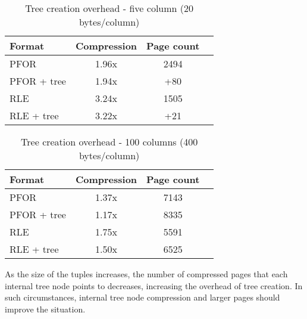 \documentclass{sig-alternate-sigmod08}
\begin{document}


\begin{table}
\caption{Tree creation overhead - five column (20 bytes/column)}
\centering
\label{table:treeCreation}
\begin{tabular}{|l|c|c|c|} \hline
Format     & Compression & Page count \\ \hline %
PFOR        & 1.96x       & 2494       \\ \hline %
PFOR + tree & 1.94x       & +80        \\ \hline %
RLE        & 3.24x       & 1505 \\ \hline %
RLE + tree & 3.22x       & +21        \\  %
\hline\end{tabular}
\end{table}
\begin{table}
\caption{Tree creation overhead - 100 columns (400 bytes/column)}
\centering
\label{table:treeCreationTwo}
\begin{tabular}{|l|c|c|c|} \hline
Format     & Compression & Page count \\ \hline %
PFOR        & 1.37x       & 7143       \\ \hline %
PFOR + tree & 1.17x       & 8335        \\ \hline %
RLE        & 1.75x       & 5591 \\ \hline %
RLE + tree & 1.50x       & 6525        \\  %

\hline\end{tabular}
\end{table}

As the size of the tuples increases, the number of compressed pages
that each internal tree node points to decreases, increasing the
overhead of tree creation.  In such circumstances, internal tree node
compression and larger pages should improve the situation.
\end{document}
